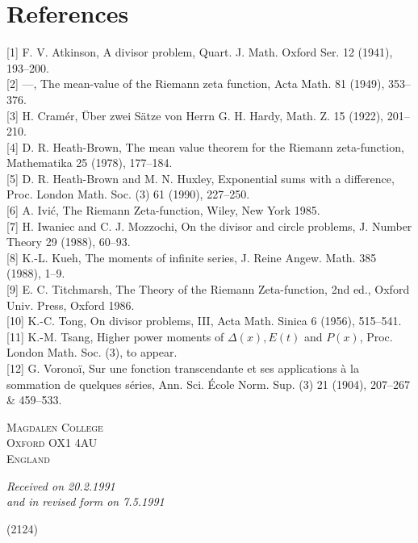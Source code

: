 \documentclass[10pt]{article}
\begin{document}
\section*{References}
[1] F. V. Atkinson, A divisor problem, Quart. J. Math. Oxford Ser. 12 (1941), 193--200.\\[0pt]
[2] ---, The mean-value of the Riemann zeta function, Acta Math. 81 (1949), 353--376.\\[0pt]
[3] H. Cramér, Über zwei Sätze von Herrn G. H. Hardy, Math. Z. 15 (1922), 201--210.\\[0pt]
[4] D. R. Heath-Brown, The mean value theorem for the Riemann zeta-function, Mathematika 25 (1978), 177--184.\\[0pt]
[5] D. R. Heath-Brown and M. N. Huxley, Exponential sums with a difference, Proc. London Math. Soc. (3) 61 (1990), 227--250.\\[0pt]
[6] A. Ivić, The Riemann Zeta-function, Wiley, New York 1985.\\[0pt]
[7] H. Iwaniec and C. J. Mozzochi, On the divisor and circle problems, J. Number Theory 29 (1988), 60--93.\\[0pt]
[8] K.-L. Kueh, The moments of infinite series, J. Reine Angew. Math. 385 (1988), 1--9.\\[0pt]
[9] E. C. Titchmarsh, The Theory of the Riemann Zeta-function, 2nd ed., Oxford Univ. Press, Oxford 1986.\\[0pt]
[10] K.-C. Tong, On divisor problems, III, Acta Math. Sinica 6 (1956), 515--541.\\[0pt]
[11] K.-M. Tsang, Higher power moments of $\Delta(x), E(t)$ and $P(x)$, Proc. London Math. Soc. (3), to appear.\\[0pt]
[12] G. Voronoï, Sur une fonction transcendante et ses applications à la sommation de quelques séries, Ann. Sci. École Norm. Sup. (3) 21 (1904), 207--267 \& 459--533.

\bigskip
\begin{flushleft}
\textsc{Magdalen College}\\
\textsc{Oxford OX1 4AU}\\
\textsc{England}
\end{flushleft}

\begin{center}
\emph{Received on 20.2.1991}\\
\emph{and in revised form on 7.5.1991}
\end{center}

\begin{flushright}
(2124)
\end{flushright}
\end{document}

